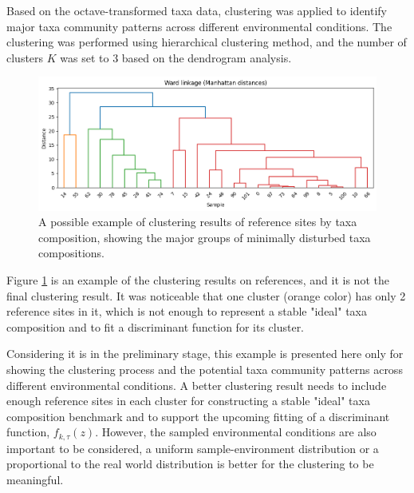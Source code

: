Based on the octave-transformed taxa data, clustering was applied to identify major taxa community patterns across different environmental conditions.
The clustering was performed using hierarchical clustering method, and the number of clusters \(K\) was set to 3 based on the dendrogram analysis.

\begin{figure}[!h]
    \centering
    \includegraphics[width=\textwidth]{../results/preliminary_results/clustering_on_references_taxa.png}
    \caption{A possible example of clustering results of reference sites by taxa composition, showing the major groups of minimally disturbed taxa compositions.}
    \label{fig:clustering_on_references_taxa}
\end{figure}

Figure \textcolor{blue}{\ref{fig:clustering_on_references_taxa}} is an example of the clustering results on references, 
and it is not the final clustering result. It was noticeable that one cluster (orange color) has only 2 reference sites in 
it, which is not enough to represent a stable "ideal" taxa composition and to fit a discriminant function for its cluster.

Considering it is in the preliminary stage, this example is presented here only for showing
the clustering process and the potential taxa community patterns across different environmental conditions.
A better clustering result needs to include enough reference sites in each cluster for constructing a stable 
"ideal" taxa composition benchmark and to support the upcoming fitting of a discriminant function, \(f_{k, \tau}(z)\).
However, the sampled environmental conditions are also important to be considered, a uniform sample-environment distribution 
or a proportional to the real world distribution is better for the clustering to be meaningful.


